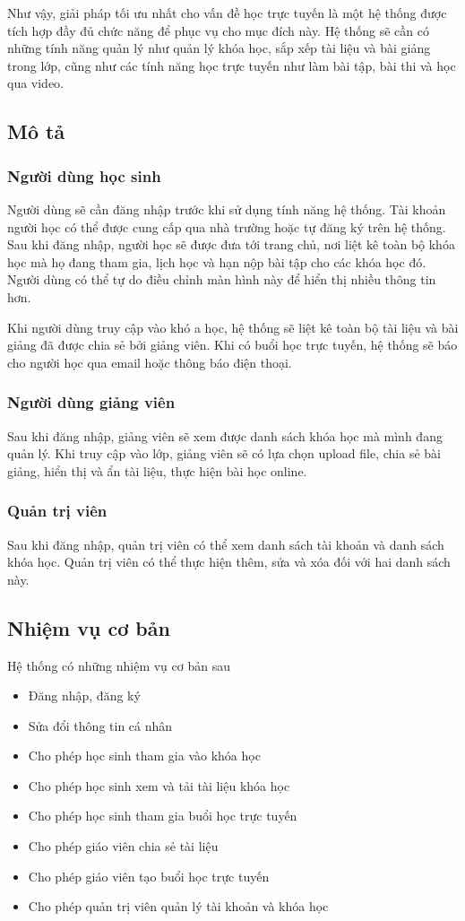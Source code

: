 \documentclass[./../main_file.tex]{subfiles}
\begin{document}
Như vậy, giải pháp tối ưu nhất cho vấn đề học trực tuyến là một hệ thống được tích hợp đầy đủ chức năng để phục vụ cho mục đích này. Hệ thống sẽ cần có những tính năng quản lý như quản lý khóa học, sắp xếp tài liệu và bài giảng trong lớp, cũng như các tính năng học trực tuyến như làm bài tập, bài thi và học qua video.
\subsection{Mô tả}
\subsubsection{Người dùng học sinh}
Người dùng sẽ cần đăng nhập trước khi sử dụng tính năng hệ thống. Tài khoản người học có thể được cung cấp qua nhà trường hoặc tự đăng ký trên hệ thống. Sau khi đăng nhập, người học sẽ được đưa tới trang chủ, nơi liệt kê toàn bộ khóa học mà họ đang tham gia, lịch học và hạn nộp bài tập cho các khóa học đó. Người dùng có thể tự do điều chỉnh màn hình này để hiển thị nhiều thông tin hơn.


Khi người dùng truy cập vào khó	a học, hệ thống sẽ liệt kê toàn bộ tài liệu và bài giảng đã được chia sẻ bởi giảng viên. Khi có buổi học trực tuyến, hệ thống sẽ báo cho người học qua email hoặc thông báo điện thoại.
\subsubsection{Người dùng giảng viên}
Sau khi đăng nhập, giảng viên sẽ xem được danh sách khóa học mà mình đang quản lý. Khi truy cập vào lớp, giảng viên sẽ có lựa chọn upload file, chia sẻ bài giảng, hiển thị và ẩn tài liệu, thực hiện bài học online.
\subsubsection{Quản trị viên}
Sau khi đăng nhập, quản trị viên có thể xem danh sách tài khoản và danh sách khóa học. Quản trị viên có thể thực hiện thêm, sửa và xóa đối với hai danh sách này.
\subsection{Nhiệm vụ cơ bản}
Hệ thống có những nhiệm vụ cơ bản sau
	\begin{itemize}
		\item Đăng nhập, đăng ký
		\item Sửa đổi thông tin cá nhân
		\item Cho phép học sinh tham gia vào khóa học
		\item Cho phép học sinh xem và tải tài liệu khóa học 
		\item Cho phép học sinh tham gia buổi học trực tuyến
		\item Cho phép giáo viên chia sẻ tài liệu
		\item Cho phép giáo viên tạo buổi học trực tuyến
		\item Cho phép quản trị viên quản lý tài khoản và khóa học
	\end{itemize}
\end{document}
